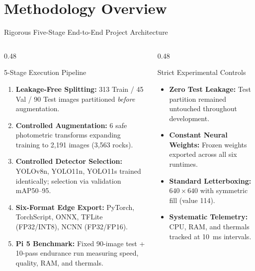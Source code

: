 \documentclass[aspectratio=169,10pt]{beamer}
\begin{document}
\section{Methodology Overview}
\begin{frame}{Rigorous Five-Stage End-to-End Project Architecture}
\begin{columns}[T]
  \begin{column}{0.48\textwidth}
    \begin{block}{\footnotesize 5-Stage Execution Pipeline}
      \footnotesize
      \begin{enumerate}\setlength{\itemsep}{1pt}
        \item \textbf{Leakage-Free Splitting:} 313 Train / 45 Val / 90 Test images partitioned \textit{before} augmentation.
        \item \textbf{Controlled Augmentation:} 6 safe photometric transforms expanding training to 2,191 images (3,563 rocks).
        \item \textbf{Controlled Detector Selection:} YOLOv8n, YOLO11n, YOLO11s trained identically; selection via validation mAP50--95.
        \item \textbf{Six-Format Edge Export:} PyTorch, TorchScript, ONNX, TFLite (FP32/INT8), NCNN (FP32/FP16).
        \item \textbf{Pi 5 Benchmark:} Fixed 90-image test + 10-pass endurance run measuring speed, quality, RAM, and thermals.
      \end{enumerate}
    \end{block}
  \end{column}
  \begin{column}{0.48\textwidth}
    \begin{block}{\footnotesize Strict Experimental Controls}
      \footnotesize
      \begin{itemize}\setlength{\itemsep}{2pt}
        \item \textbf{Zero Test Leakage:} Test partition remained untouched throughout development.
        \item \textbf{Constant Neural Weights:} Frozen weights exported across all six runtimes.
        \item \textbf{Standard Letterboxing:} $640\times640$ with symmetric fill (value 114).
        \item \textbf{Systematic Telemetry:} CPU, RAM, and thermals tracked at 10~ms intervals.
      \end{itemize}
    \end{block}
  \end{column}
\end{columns}
\end{frame}
\end{document}
